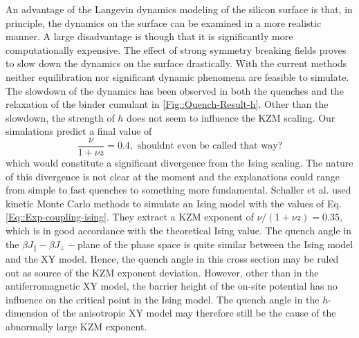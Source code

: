 	An advantage of the Langevin dynamics modeling of the silicon surface is that, in principle, the dynamics on the surface can be examined in a more realistic manner. A large disadvantage is though that it is significantly more computationally expensive. The effect of strong symmetry breaking fields proves to slow down the dynamics on the surface drastically. With the current methods neither equilibration nor significant dynamic phenomena are feasible to simulate. The slowdown of the dynamics has been observed in both the quenches and the relaxation of the binder cumulant in \autoref{Fig::Quench-Result-h}. Other than the slowdown, the strength of $h$ does not seem to influence the KZM	scaling. Our simulations predict a final value of
	\begin{equation}
		\frac{\nu}{1 + \nu z} =	0.4,  \text{         shouldnt even be called that way?}
	\end{equation}
	which would constitute a significant divergence from the Ising scaling. The nature of this divergence is not clear at the moment and the explanations could range from simple to fast quenches to something more fundamental. Schaller et al. \cite{schaller2023sequential} used kinetic Monte Carlo methods to simulate an Ising model with the values of Eq. \eqref{Eq::Exp-coupling-ising}. They extract a KZM exponent of $\nu /	(1 + \nu z) =	0.35$, which is in good accordance with the theoretical Ising value. The quench angle in the $\beta J_\parallel-\beta J_\perp-$plane of the phase space is quite similar between the Ising model and the XY model. Hence, the quench angle in this cross section may be ruled out as source of the KZM exponent deviation. However, other than in the antiferromagnetic XY model, the barrier height of the on-site potential has no influence on the critical point in the Ising model. The quench angle in the $h$-dimension of the anisotropic XY model may therefore still be the cause of the abnormally large KZM exponent. \\
	

